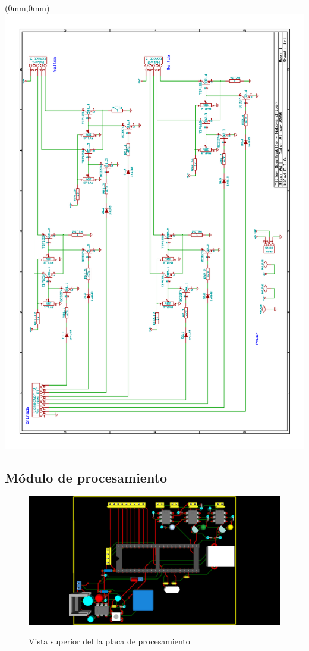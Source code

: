 \cleardoublepage
\begin{textblock*}{297mm}(0mm,0mm)
   \includegraphics[width=\paperwidth]{./img/driver.png}
   \label{cap:driver_schema}
\end{textblock*}

\cleardoublepage


\newpage
\subsection{M\'odulo de procesamiento}
\begin{figure}[htp]
  \centering
  \includegraphics[width=14cm]{./img/pic_board_3d_1.png}
  \label{fig:pic_board_3d_1}
  \caption{Vista superior del la placa de procesamiento}
\end{figure}

